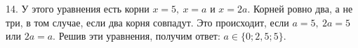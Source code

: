 14. У этого уравнения есть корни $x=5,\ x=a$ и $x=2a.$ Корней ровно два, а не три, в том случае, если два корня совпадут. Это происходит, если $a=5,\ 2a=5$ или $2a=a.$ Решив эти уравнения, получим ответ: $a\in\{0; 2,5;5\}.$\\
